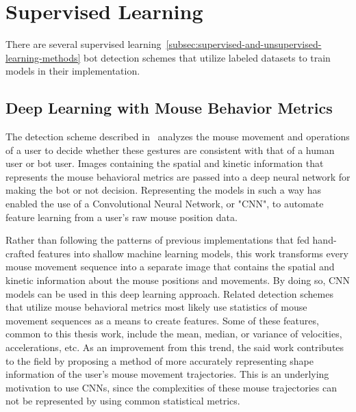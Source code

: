 
\section{Supervised Learning}\label{sec:supervised-learning}
There are several supervised learning~\ref{subsec:supervised-and-unsupervised-learning-methods} bot detection schemes that utilize labeled datasets to train models in their implementation.

\subsection{Deep Learning with Mouse Behavior Metrics}\label{subsec:deep-learning-with-mouse-behavior}
The detection scheme described in~\cite{deep_learning_detection_with_mouse_behavior} analyzes the mouse movement and operations of a user to decide whether these gestures are consistent with that of a human user or bot user.
Images containing the spatial and kinetic information that represents the mouse behavioral metrics are passed into a deep neural network for making the bot or not decision.
Representing the models in such a way has enabled the use of a Convolutional Neural Network, or "CNN", to automate feature learning from a user's raw mouse position data.

Rather than following the patterns of previous implementations that fed hand-crafted features into shallow machine learning models, this work transforms every mouse movement sequence into a separate image that contains the spatial and kinetic information about the mouse positions and movements.
By doing so, CNN models can be used in this deep learning approach.
Related detection schemes that utilize mouse behavioral metrics most likely use statistics of mouse movement sequences as a means to create features.
Some of these features, common to this thesis work, include the mean, median, or variance of velocities, accelerations, etc.
As an improvement from this trend, the said work contributes to the field by proposing a method of more accurately representing shape information of the user's mouse movement trajectories.
This is an underlying motivation to use CNNs, since the complexities of these mouse trajectories can not be represented by using common statistical metrics.

